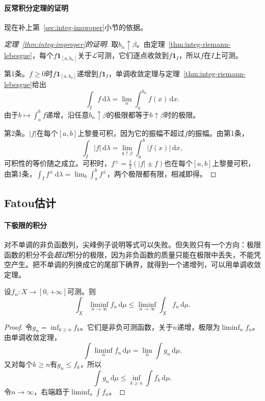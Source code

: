 \paragraph{反常积分定理的证明}
现在补上第~\ref{sec:integ-improper}小节的依据。

\begin{proof}[定理~\ref{thm:integ-improper}的证明]
取$b_n\uparrow\beta$。由定理~\ref{thm:integ-riemann-lebesgue}，每个$f\mathbf 1_{[a,b_n]}$关于$\mathcal L$可测，它们逐点收敛到$f\mathbf 1_I$，所以$f$在$I$上可测。

第1条。$f\geq0$时$f\mathbf 1_{[a,b_n]}$递增到$f\mathbf 1_I$，单调收敛定理与定理~\ref{thm:integ-riemann-lebesgue}给出
\[
 \int_If\,\mathrm d\lambda=\lim_n\int_a^{b_n}f(x)\,\mathrm dx .
\]
由于$b\mapsto\int_a^bf$递增，沿任意$b_n\uparrow\beta$的极限都等于$b\uparrow\beta$时的极限。

第2条。$\lvert f\rvert$在每个$[a,b]$上黎曼可积，因为它的振幅不超过$f$的振幅。由第1条，
\[
 \int_I\lvert f\rvert\,\mathrm d\lambda=\lim_{b\uparrow\beta}\int_a^b\lvert f(x)\rvert\,\mathrm dx,
\]
可积性的等价随之成立。可积时，$f^\pm=\frac12(\lvert f\rvert\pm f)$也在每个$[a,b]$上黎曼可积，由第1条，$\int_If^\pm\,\mathrm d\lambda=\lim_b\int_a^bf^\pm$，两个极限都有限，相减即得。
\end{proof}

\subsection{Fatou估计}
\label{sec:integ-fatou}

\paragraph{下极限的积分}
对不单调的非负函数列，尖峰例子说明等式可以失败。但失败只有一个方向：极限函数的积分不会\emph{超过}积分的极限，因为非负函数的质量只能在极限中丢失，不能凭空产生。把不单调的列换成它的尾部下确界，就得到一个递增列，可以用单调收敛定理。

\begin{theorem}[Fatou引理]
\label{thm:integ-fatou}
设$f_n:X\to[0,+\infty]$可测。则
\begin{equation}
 \int_X\liminf_{n\to\infty}f_n\,\mathrm d\mu\leq\liminf_{n\to\infty}\int_Xf_n\,\mathrm d\mu .
 \label{eq:integ-fatou}
\end{equation}
\end{theorem}

\begin{proof}
令$g_n=\inf_{k\geq n}f_k$。它们是非负可测函数，关于$n$递增，极限为$\liminf_nf_n$。由单调收敛定理，
\[
 \int\liminf_nf_n\,\mathrm d\mu=\lim_n\int g_n\,\mathrm d\mu .
\]
又对每个$k\geq n$有$g_n\leq f_k$，所以
\[
 \int g_n\,\mathrm d\mu\leq\inf_{k\geq n}\int f_k\,\mathrm d\mu .
\]
令$n\to\infty$，右端趋于$\liminf_n\int f_n$。
\end{proof}

